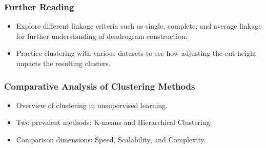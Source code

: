 \documentclass{beamer}
\begin{document}
\begin{frame}[fragile]
    \frametitle{Further Reading}
    \begin{itemize}
        \item Explore different linkage criteria such as single, complete, and average linkage for further understanding of dendrogram construction.
        \item Practice clustering with various datasets to see how adjusting the cut height impacts the resulting clusters.
    \end{itemize}
\end{frame}

\begin{frame}[fragile]
    \frametitle{Comparative Analysis of Clustering Methods}
    \begin{itemize}
        \item Overview of clustering in unsupervised learning.
        \item Two prevalent methods: K-means and Hierarchical Clustering.
        \item Comparison dimensions: Speed, Scalability, and Complexity.
    \end{itemize}
\end{frame}
\end{document}
